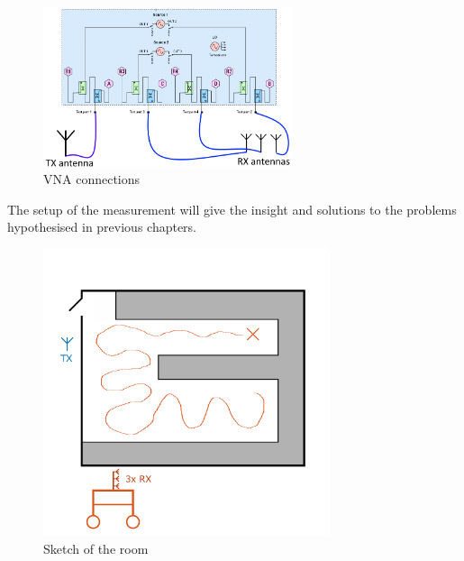 \begin{figure}[H]
\centering
\includegraphics[width=0.65\textwidth]{figures/Gimp_figures/4portVNA.png}
\caption{VNA connections}
\label{connection_diagram}
\end{figure}







The setup of the measurement will give the insight and solutions to the problems hypothesised in previous chapters. 

\begin{figure}[H]
\centering
\includegraphics[width=0.75\textwidth]{figures/Gimp_figures/MeasSetup.png}
\caption{Sketch of the room}
\label{room sketch}
\end{figure}

